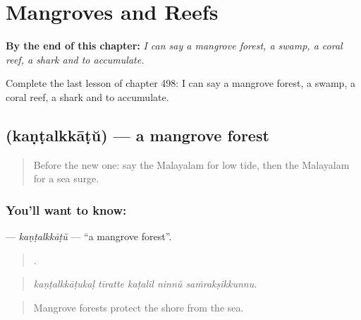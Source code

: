 
\chapter{Mangroves and Reefs}
\label{ch:ml-mangroves-and-reefs}

\begin{chapteropening}
\textbf{By the end of this chapter:} \emph{I can say a mangrove forest, a swamp, a coral reef, a shark and to accumulate.}

Complete the last lesson of chapter 498: I can say a mangrove forest, a swamp, a coral reef, a shark and to accumulate.
\end{chapteropening}

\section[\texorpdfstring{\ml{കണ്ടൽക്കാട്} (kaṇṭalkkāṭŭ)}{കണ്ടൽക്കാട് (kaṇṭalkkāṭŭ)}]{ (kaṇṭalkkāṭŭ) — a mangrove forest}

\label{lesson:ML-C498-kantalkkatu}



\begin{quote}
Before the new one: say the Malayalam for low tide, then the Malayalam for a sea surge.
\end{quote}

\subsection*{You'll want to know: }
\textbf{} — \emph{kaṇṭalkkāṭŭ} — \textquotedblleft{}a mangrove forest\textquotedblright{}.

\begin{quote}
    .
\end{quote}

\begin{quote}
\emph{kaṇṭalkkāṭukaḷ tīratte kaṭalil ninnŭ saṁrakṣikkunnu.}
\end{quote}

\begin{quote}
Mangrove forests protect the shore from the sea.
\end{quote}

